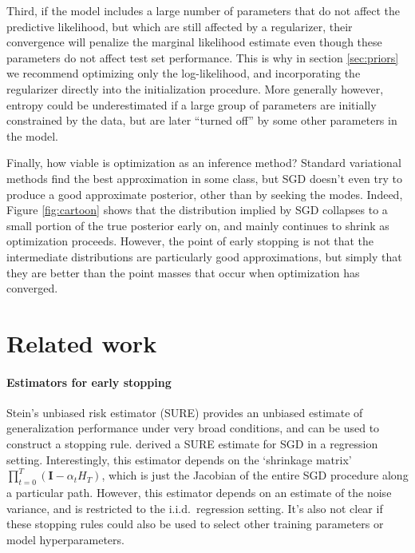 \documentclass[]{article}
\newcommand{\vI}{\mathbf{I}}
\def\iid{i.i.d.\ }
\newcommand{\stepsize}{\alpha}
\begin{document}
Third, if the model includes a large number of parameters that do not affect the predictive likelihood, but which are still affected by a regularizer, their convergence will penalize the marginal likelihood estimate even though these parameters do not affect test set performance.
This is why in section \ref{sec:priors} we recommend optimizing only the log-likelihood, and incorporating the regularizer directly into the initialization procedure.
More generally however, entropy could be underestimated if a large group of parameters are initially constrained by the data, but are later ``turned off'' by some other parameters in the model.

Finally, how viable is optimization as an inference method?
Standard variational methods find the best approximation in some class, but SGD doesn't even try to produce a good approximate posterior, other than by seeking the modes.
Indeed, Figure \ref{fig:cartoon} shows that the distribution implied by SGD collapses to a small portion of the true posterior early on, and mainly continues to shrink as optimization proceeds.
However, the point of early stopping is not that the intermediate distributions are particularly good approximations, but simply that they are better than the point masses that occur when optimization has converged.


\section{Related work}

\paragraph{Estimators for early stopping}
Stein's unbiased risk estimator (SURE) \citep{stein1981estimation} provides an unbiased estimate of generalization performance under very broad conditions, and can be used to construct a stopping rule.
\citet{raskutti2014early} derived a SURE estimate for SGD in a regression setting.
Interestingly, this estimator depends on the `shrinkage matrix' $\prod_{t=0}^{T} \left( \vI - \stepsize_t H_T \right)$, which is just the Jacobian of the entire SGD procedure along a particular path.
However, this estimator depends on an estimate of the noise variance, and is restricted to the \iid regression setting.
It's also not clear if these stopping rules could also be used to select other training parameters or model hyperparameters.
\end{document}
